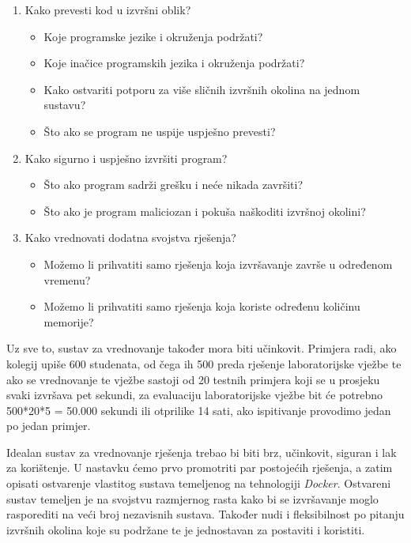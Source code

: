 \documentclass[times, utf8, zavrsni]{fer}
\begin{document}
\begin{enumerate}
\item Kako prevesti kod u izvršni oblik?
	\begin{itemize}
	\item Koje programske jezike i okruženja podržati?
	\item Koje inačice programskih jezika i okruženja podržati?
	\item Kako ostvariti potporu za više sličnih izvršnih okolina na jednom sustavu?
	\item Što ako se program ne uspije uspješno prevesti?
	\end{itemize}
\item Kako sigurno i uspješno izvršiti program?
	\begin{itemize}
	\item Što ako program sadrži grešku i neće nikada završiti?
	\item Što ako je program maliciozan i pokuša naškoditi izvršnoj okolini?
	\end{itemize}
\item Kako vrednovati dodatna svojstva rješenja?
	\begin{itemize}
	\item Možemo li prihvatiti samo rješenja koja izvršavanje završe u određenom vremenu?
	\item Možemo li prihvatiti samo rješenja koja koriste određenu količinu memorije?
	\end{itemize}
\end{enumerate}

Uz sve to, sustav za vrednovanje također mora biti učinkovit. Primjera radi, ako kolegij upiše 600 studenata, od čega ih 500 preda rješenje laboratorijske vježbe te ako se vrednovanje te vježbe sastoji od 20 testnih primjera koji se u prosjeku svaki izvršava pet sekundi, za evaluaciju laboratorijske vježbe bit će potrebno 500*20*5 = 50.000 sekundi ili otprilike 14 sati, ako ispitivanje provodimo jedan po jedan primjer.

Idealan sustav za vrednovanje rješenja trebao bi biti brz, učinkovit, siguran i lak za korištenje. U nastavku ćemo prvo promotriti par postojećih rješenja, a zatim opisati ostvarenje vlastitog sustava temeljenog na tehnologiji {\textit{Docker}}. Ostvareni sustav temeljen je na svojstvu razmjernog rasta kako bi se izvršavanje moglo rasporediti na veći broj nezavisnih sustava. Također nudi i fleksibilnost po pitanju izvršnih okolina koje su podržane te je jednostavan za postaviti i koristiti.
\end{document}
